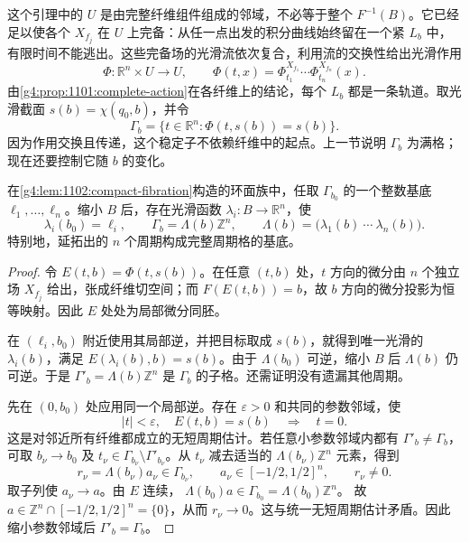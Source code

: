 这个引理中的 \(U\) 是由完整纤维组件组成的邻域，不必等于整个 \(F^{-1}(B)\)。它已经足以使各个 \(X_{f_j}\) 在 \(U\) 上完备：从任一点出发的积分曲线始终留在一个紧 \(L_b\) 中，有限时间不能逃出。这些完备场的光滑流依次复合，利用流的交换性给出光滑作用
\[
	\Phi:\mathbb R^n\times U\longrightarrow U,\qquad
	\Phi(t,x)=\Phi^{X_{f_1}}_{t_1}\cdots\Phi^{X_{f_n}}_{t_n}(x).
\]
由\cref{g4:prop:1101:complete-action}在各纤维上的结论，每个 \(L_b\) 都是一条轨道。取光滑截面 \(s(b)=\chi(q_0,b)\)，并令
\begin{equation}\label{g4:eq:1102:period-lattice}
	\Gamma_b=\{t\in\mathbb R^n:\Phi(t,s(b))=s(b)\}.
\end{equation}
因为作用交换且传递，这个稳定子不依赖纤维中的起点。上一节说明 \(\Gamma_b\) 为满格；现在还要控制它随 \(b\) 的变化。

\begin{lemma}\label{g4:lem:1102:smooth-period-basis}
	在\cref{g4:lem:1102:compact-fibration}构造的环面族中，任取 \(\Gamma_{b_0}\) 的一个整数基底 \(\ell_1,\ldots,\ell_n\)。缩小 \(B\) 后，存在光滑函数
	\(\lambda_i:B\to\mathbb R^n\)，使
	\[
		\lambda_i(b_0)=\ell_i,\qquad
		\Gamma_b=\Lambda(b)\mathbb Z^n,\qquad
		\Lambda(b)=\bigl(\lambda_1(b)\ \cdots\ \lambda_n(b)\bigr).
	\]
	特别地，延拓出的 \(n\) 个周期构成完整周期格的基底。
\end{lemma}
\begin{proof}
	令 \(E(t,b)=\Phi(t,s(b))\)。在任意 \((t,b)\) 处，\(t\) 方向的微分由 \(n\) 个独立场 \(X_{f_j}\) 给出，张成纤维切空间；而 \(F(E(t,b))=b\)，故 \(b\) 方向的微分投影为恒等映射。因此 \(E\) 处处为局部微分同胚。

	在 \((\ell_i,b_0)\) 附近使用其局部逆，并把目标取成 \(s(b)\)，就得到唯一光滑的 \(\lambda_i(b)\)，满足 \(E(\lambda_i(b),b)=s(b)\)。由于 \(\Lambda(b_0)\) 可逆，缩小 \(B\) 后 \(\Lambda(b)\) 仍可逆。于是
	\(\Gamma'_b=\Lambda(b)\mathbb Z^n\) 是 \(\Gamma_b\) 的子格。还需证明没有遗漏其他周期。

	先在 \((0,b_0)\) 处应用同一个局部逆。存在 \(\varepsilon>0\) 和共同的参数邻域，使
	\[
		|t|<\varepsilon,\quad E(t,b)=s(b)
		\quad\Longrightarrow\quad t=0.
	\]
	这是对邻近所有纤维都成立的无短周期估计。若任意小参数邻域内都有 \(\Gamma'_b\ne\Gamma_b\)，可取 \(b_\nu\to b_0\) 及
	\(t_\nu\in\Gamma_{b_\nu}\setminus\Gamma'_{b_\nu}\)。从 \(t_\nu\) 减去适当的 \(\Lambda(b_\nu)\mathbb Z^n\) 元素，得到
	\[
		r_\nu=\Lambda(b_\nu)a_\nu\in\Gamma_{b_\nu},
		\qquad a_\nu\in[-1/2,1/2]^n,\qquad r_\nu\ne0.
	\]
	取子列使 \(a_\nu\to a\)。由 \(E\) 连续，
	\(\Lambda(b_0)a\in\Gamma_{b_0}=\Lambda(b_0)\mathbb Z^n\)。
	故 \(a\in\mathbb Z^n\cap[-1/2,1/2]^n=\{0\}\)，从而 \(r_\nu\to0\)。这与统一无短周期估计矛盾。因此缩小参数邻域后 \(\Gamma'_b=\Gamma_b\)。
\end{proof}

